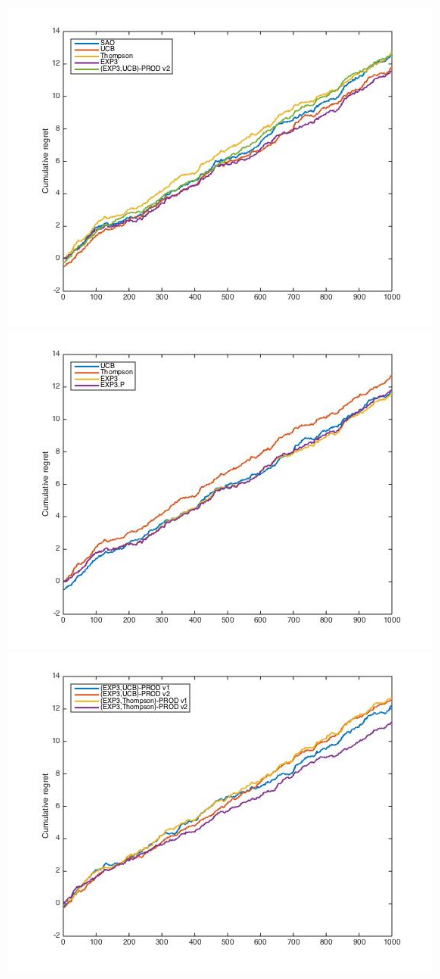 \documentclass[10.5pt]{article}
\begin{document}
\begin{figure}[H]
  \includegraphics[width=\linewidth]{Adv1_mix.jpg}
  \label{fig:awesome_image1}
\endminipage\hfill
{}
  \includegraphics[width=\linewidth]{Adv1_old.jpg}
  \label{fig:awesome_image2}
\endminipage\hfill
{}%
  \includegraphics[width=\linewidth]{Adv1_prod.jpg}

\end{figure}
\end{document}
